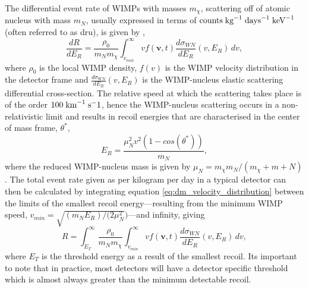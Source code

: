 The differential event rate of WIMPs with masses $m_{\chi}$, scattering off of atomic nucleus with mass $m_{N}$, usually expressed in terms of $\text{counts} \; \text{kg}^{-1} \; \text{days}^{-1} \; \text{keV}^{-1}$ (often referred to as dru), is given by \cite{Bertone_book},
%
\begin{equation} \label{eq:dm_velocity_distribution}
    \frac{dR}{dE_{R}} = \frac{\rho_{0}}{m_{N} m_{\chi}} \int_{v_{min}}^{\infty} vf(\boldsymbol{v}, t) \frac{d\sigma_{WN}}{dE_{R}}(v, E_{R}) \, dv, 
\end{equation}
%
where $\rho_{0}$ is the local WIMP density, $f(v)$ is the WIMP velocity distribution in the detector frame and $\frac{d\sigma_{WN}}{dE_{R}}(v, E_{R})$ is the WIMP-nucleus elastic scattering differential cross-section. The relative speed at which the scattering takes place is of the order $100 \; \text{km}^{-1} \; \text{s}^-1$, hence the WIMP-nucleus scattering occurs in a non-relativistic limit and results in recoil energies that are characterised in the center of mass frame, $\theta^{\ast}$,
%
\begin{equation} \label{eq:cm_wimp_energy}
    E_{R} = \frac{\mu^{2}_{N}v^{2}(1-cos(\theta^{\ast}))}{m_{N}},
\end{equation}
%
where the reduced WIMP-nucleus mass is given by $\mu_{N} = m_{\chi}m_{N}/(m_{\chi} + m+{N})$. The total event rate given as per kilogram per day in a typical detector can then be calculated by integrating equation \ref{eq:dm_velocity_distribution} between the limits of the smallest recoil energy---resulting from the minimum WIMP speed, $v_{min} = \sqrt{(m_{N}E_{R})/(2\mu^{2}_{N}})$---and infinity, giving 
%
\begin{equation} \label{eq:dm_velocity_distribution}
    R = \int_{E_{T}}^{\infty} \frac{\rho_{0}}{m_{N} m_{\chi}} \int_{v_{min}}^{\infty} vf(\boldsymbol{v}, t) \frac{d\sigma_{WN}}{dE_{R}}(v, E_{R}) \, dv, 
\end{equation}
%
where $E_{T}$ is the threshold energy as a result of the smallest recoil. Its important to note that in practice, most detectors will have a detector specific threshold which is almost always greater than the minimum detectable recoil. 

